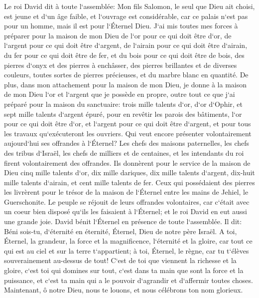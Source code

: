 \verse Le roi David dit à toute l`assemblée: Mon fils Salomon, le seul que Dieu ait choisi, est jeune et d`un âge faible, et l`ouvrage est considérable, car ce palais n`est pas pour un homme, mais il est pour l`Éternel Dieu. 
\verse J`ai mis toutes mes forces à préparer pour la maison de mon Dieu de l`or pour ce qui doit être d`or, de l`argent pour ce qui doit être d`argent, de l`airain pour ce qui doit être d`airain, du fer pour ce qui doit être de fer, et du bois pour ce qui doit être de bois, des pierres d`onyx et des pierres à enchâsser, des pierres brillantes et de diverses couleurs, toutes sortes de pierres précieuses, et du marbre blanc en quantité. 
\verse De plus, dans mon attachement pour la maison de mon Dieu, je donne à la maison de mon Dieu l`or et l`argent que je possède en propre, outre tout ce que j`ai préparé pour la maison du sanctuaire: 
\verse trois mille talents d`or, d`or d`Ophir, et sept mille talents d`argent épuré, pour en revêtir les parois des bâtiments, 
\verse l`or pour ce qui doit être d`or, et l`argent pour ce qui doit être d`argent, et pour tous les travaux qu`exécuteront les ouvriers. Qui veut encore présenter volontairement aujourd`hui ses offrandes à l`Éternel? 
\verse Les chefs des maisons paternelles, les chefs des tribus d`Israël, les chefs de milliers et de centaines, et les intendants du roi firent volontairement des offrandes. 
\verse Ils donnèrent pour le service de la maison de Dieu cinq mille talents d`or, dix mille dariques, dix mille talents d`argent, dix-huit mille talents d`airain, et cent mille talents de fer. 
\verse Ceux qui possédaient des pierres les livrèrent pour le trésor de la maison de l`Éternel entre les mains de Jehiel, le Guerschonite. 
\verse Le peuple se réjouit de leurs offrandes volontaires, car c`était avec un coeur bien disposé qu`ils les faisaient à l`Éternel; et le roi David en eut aussi une grande joie. 
\verse David bénit l`Éternel en présence de toute l`assemblée. Il dit: Béni sois-tu, d`éternité en éternité, Éternel, Dieu de notre père Israël. 
\verse A toi, Éternel, la grandeur, la force et la magnificence, l`éternité et la gloire, car tout ce qui est au ciel et sur la terre t`appartient; à toi, Éternel, le règne, car tu t`élèves souverainement au-dessus de tout! 
\verse C`est de toi que viennent la richesse et la gloire, c`est toi qui domines sur tout, c`est dans ta main que sont la force et la puissance, et c`est ta main qui a le pouvoir d`agrandir et d`affermir toutes choses. 
\verse Maintenant, ô notre Dieu, nous te louons, et nous célébrons ton nom glorieux. 
